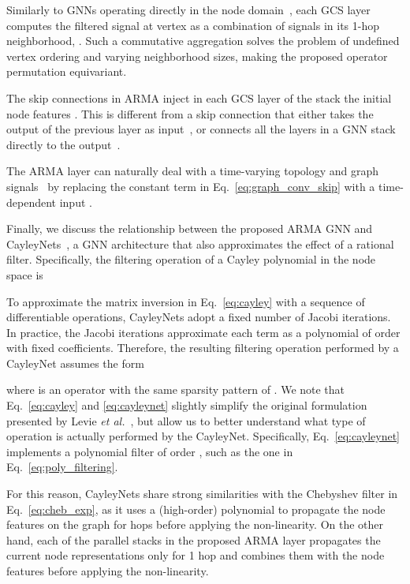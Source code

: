 \documentclass{article}
\begin{document}
Similarly to GNNs operating directly in the node domain~\cite{scarselli2009graph,gallicchio2010graph}, each GCS layer computes the filtered signal  at vertex  as a combination of signals  in its 1-hop neighborhood, . 
Such a commutative aggregation solves the problem of undefined vertex ordering and varying neighborhood sizes, making the proposed operator permutation equivariant.

The skip connections in ARMA inject in each GCS layer  of the stack the initial node features . 
This is different from a skip connection that either takes the output of the previous layer  as input~\cite{pham2017column,hamilton2017inductive}, or connects all the layers in a GNN stack directly to the output~\cite{xu2018representation}.

The ARMA layer can naturally deal with a time-varying topology and graph signals~\cite{holme2015modern,grattarola2018learning} by replacing the constant term  in Eq.~\eqref{eq:graph_conv_skip} with a time-dependent input .

Finally, we discuss the relationship between the proposed ARMA GNN and CayleyNets~\cite{levie2017cayleynets}, a GNN architecture that also approximates the effect of a rational filter.
Specifically, the filtering operation of a Cayley polynomial in the node space is


To approximate the matrix inversion in Eq.~\eqref{eq:cayley} with a sequence of differentiable operations, CayleyNets adopt a fixed number  of Jacobi iterations.
In practice, the Jacobi iterations approximate each term  as a polynomial of order  with fixed coefficients.
Therefore, the resulting filtering operation performed by a CayleyNet assumes the form

where  is an operator with the same sparsity pattern of .
We note that Eq.~\eqref{eq:cayley} and \eqref{eq:cayleynet} slightly simplify the original formulation presented by Levie \emph{et al.}~\cite{levie2017cayleynets}, but allow us to better understand what type of operation is actually performed by the CayleyNet.
Specifically, Eq.~\eqref{eq:cayleynet} implements a polynomial filter of order , such as the one in Eq.~\eqref{eq:poly_filtering}.

For this reason, CayleyNets share strong similarities with the Chebyshev filter in Eq.~\eqref{eq:cheb_exp}, as it uses a (high-order) polynomial to propagate the node features on the graph for  hops before applying the non-linearity.
On the other hand, each of the  parallel stacks in the proposed ARMA layer propagates the current node representations  only for 1 hop and combines them with the node features  before applying the non-linearity.
\end{document}
